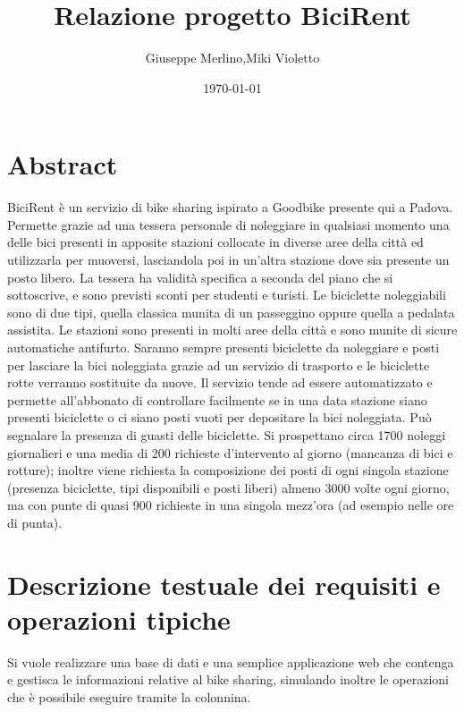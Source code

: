 \documentclass[a4paper,twoside]{article}
\author{Giuseppe Merlino,Miki Violetto}
\title{Relazione progetto BiciRent}
\date{\today}
\begin{document}
\maketitle

\newpage
\tableofcontents
\newpage
\listoffigures
\newpage

%

\section{Abstract}
BiciRent è un servizio di bike sharing ispirato a Goodbike presente qui a Padova.\newline
Permette grazie ad una tessera personale di noleggiare in qualsiasi momento una delle bici presenti in apposite stazioni collocate in diverse aree della città ed utilizzarla per muoversi, lasciandola poi in un'altra stazione dove sia presente un posto libero.\newline
La tessera ha validità specifica a seconda del piano che si sottoscrive, e sono previsti sconti per studenti e turisti.\newline
Le biciclette noleggiabili sono di due tipi, quella classica munita di un passeggino oppure quella a pedalata assistita.\newline
Le stazioni sono presenti in molti aree della città e sono munite di sicure automatiche antifurto. Saranno sempre presenti biciclette da noleggiare e posti per lasciare la bici noleggiata grazie ad un servizio di trasporto e le biciclette rotte verranno sostituite da nuove.\newline
Il servizio tende ad essere automatizzato e permette all'abbonato di controllare facilmente se in una data stazione siano presenti biciclette o ci siano posti vuoti per depositare la bici noleggiata. Può segnalare la presenza di guasti delle biciclette.\newline
Si prospettano circa 1700 noleggi giornalieri e una media di 200 richieste d'intervento al giorno (mancanza di bici e rotture); inoltre viene richiesta la composizione dei posti di ogni singola stazione (presenza biciclette, tipi disponibili e posti liberi) almeno 3000 volte ogni giorno, ma con punte di quasi 900 richieste in una singola mezz'ora (ad esempio nelle ore di punta).

\section{Descrizione testuale dei requisiti e operazioni tipiche}
Si vuole realizzare una base di dati e una semplice applicazione web che contenga e gestisca le informazioni relative al bike sharing, simulando inoltre le operazioni che è possibile eseguire tramite la colonnina.
\end{document}
